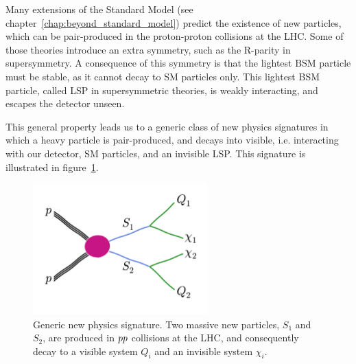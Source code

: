 

Many extensions of the Standard Model (see chapter~\ref{chap:beyond_standard_model}) predict the 
existence of new particles, which can be pair-produced in the proton-proton collisions at the LHC. 
Some of those theories introduce an extra symmetry, such as the R-parity in supersymmetry. A
consequence of this symmetry is that the lightest BSM particle must be stable, as it cannot decay
to SM particles only. This lightest BSM particle, called LSP in supersymmetric theories, is weakly
interacting, and escapes the detector unseen. 

This general property leads us to a generic class of new physics signatures in which a heavy
particle is pair-produced, and decays into visible, i.e. interacting with our detector, SM
particles, and an invisible LSP. This signature is illustrated in figure~\ref{fig:razor_signature}.

\begin{figure}[htpb]
  \centering
  \includegraphics[width=0.6\textwidth,clip=true,trim=0 1.8cm 0
0.8cm]{figures/razor_variables/signature} 
  \caption{Generic new physics signature. Two massive new particles, $S_1$ and $S_2$, are produced
in ${p}{p}$ collisions at the LHC, and consequently decay to a visible system $Q_i$ and an invisible
system $\chi_i$. \label{fig:razor_signature}}
\end{figure}

